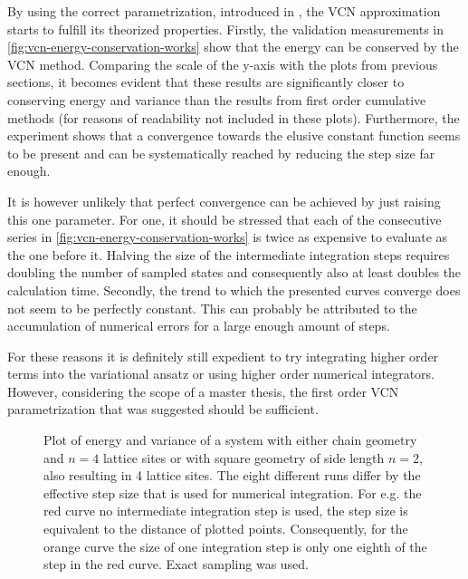 By using the correct parametrization, introduced in , the VCN approximation starts to fulfill its theorized properties.
Firstly, the validation measurements in \autoref{fig:vcn-energy-conservation-works} show that the energy can be conserved by the VCN method.
Comparing the scale of the y-axis with the plots from previous sections, it becomes evident that these results are significantly closer to conserving energy and variance than the results from first order cumulative methods (for reasons of readability not included in these plots).
Furthermore, the experiment shows that a convergence towards the elusive constant function seems to be present and can be systematically reached by reducing the step size far enough.

It is however unlikely that perfect convergence can be achieved by just raising this one parameter.
For one, it should be stressed that each of the consecutive series in \autoref{fig:vcn-energy-conservation-works} is twice as expensive to evaluate as the one before it.
Halving the size of the intermediate integration steps requires doubling the number of sampled states and consequently also at least doubles the calculation time.
Secondly, the trend to which the presented curves converge does not seem to be perfectly constant.
This can probably be attributed to the accumulation of numerical errors for a large enough amount of steps.

For these reasons it is definitely still expedient to try integrating higher order terms into the variational ansatz or using higher order numerical integrators.
However, considering the scope of a master thesis, the first order VCN parametrization that was suggested should be sufficient.


\begin{figure}[htbp]
    \centering
    \vspace{-0.5cm}
    \caption{
            Plot of energy and variance of a system with either chain geometry and $n=4$ lattice sites or with square geometry of side length $n=2$, also resulting in 4 lattice sites.
            The eight different runs differ by the effective step size that is used for numerical integration.
            For e.g. the red curve no intermediate integration step is used, the step size is equivalent to the distance of plotted points.
            Consequently, for the orange curve the size of one integration step is only one eighth of the step in the red curve.
            Exact sampling was used.
        }
    \label{fig:vcn-energy-conservation-works}
\end{figure}

